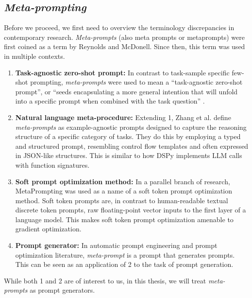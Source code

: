 \subsection{\textit{Meta-prompting}}
Before we proceed, we first need to overview the terminology discrepancies in contemporary research. 
\textit{Meta-prompts} (also meta prompts or metaprompts) were first coined as a term by Reynolds and McDonell\cite{reynolds2021promptprogramminglargelanguage}. 
Since then, this term was used in multiple contexts.
\begin{enumerate}
    \item \textbf{Task-agnostic zero-shot prompt:} In contrast to task-sample specific few-shot prompting, 
    \textit{meta-prompts} were used to mean a ``task-agnostic zero-shot prompt'', or ``seeds encapsulating a more general intention that will unfold into
    a specific prompt when combined with the task question'' \cite{reynolds2021promptprogramminglargelanguage}. 
    \item \textbf{Natural language meta-procedure:} Extending 1, Zhang et al.\cite{zhang2025metapromptingaisystems} define \textit{meta-prompts} as example-agnostic prompts
    designed to capture the reasoning structure of a specific category of tasks. They do this by employing a typed and structured prompt, 
    resembling control flow templates and often expressed in JSON-like structures.
    This is similar to how DSPy\cite{khattab2023dspycompilingdeclarativelanguage} implements LLM calls with function signatures.
    \item \textbf{Soft prompt optimization method:} In a parallel branch of research, MetaPrompting\cite{hou2023metapromptinglearninglearnbetter} 
    was used as a name of a soft token prompt optimization method. Soft token prompts are, in contrast to human-readable textual discrete token prompts, 
    raw floating-point vector inputs to the first layer of a language model. This makes soft token prompt optimization amenable to gradient optimization.
    \item \textbf{Prompt generator:} In automatic prompt engineering and prompt optimization literature, \textit{meta-prompt} is a prompt that generates prompts\cite{dewynter2024metaprompting}.
    This can be seen as an application of 2 to the task of prompt generation\cite{zhang2025metapromptingaisystems}.
\end{enumerate}

While both 1 and 2 are of interest to us, in this thesis, we will treat \textit{meta-prompts} as prompt generators. 

